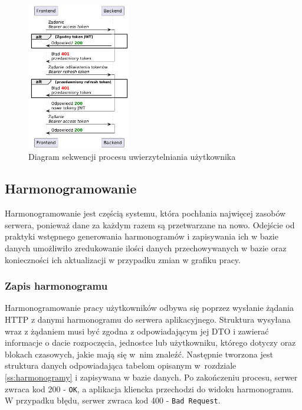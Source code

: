 \begin{figure} [H]
    \centering
    \includegraphics[width=0.4\textwidth]{graf/jwtSeq.png}
    \caption{Diagram sekwencji procesu uwierzytelniania użytkownika}
    \label{fig:authSequence}
\end{figure}

\subsection{Harmonogramowanie}

Harmonogramowanie jest częścią systemu, która pochłania najwięcej zasobów serwera, ponieważ dane za każdym razem są przetwarzane na nowo. Odejście od praktyki wstępnego generowania harmonogramów i zapisywania ich w bazie danych umożliwiło zredukowanie ilości danych przechowywanych w bazie oraz konieczności ich aktualizacji w przypadku zmian w grafiku pracy.

\subsubsection{Zapis harmonogramu}

Harmonogramowanie pracy użytkowników odbywa się poprzez wysłanie żądania HTTP z danymi harmonogramu do serwera aplikacyjnego. Struktura wysyłana wraz z żądaniem musi być zgodna z odpowiadającym jej DTO i zawierać informacje o dacie rozpoczęcia, jednostce lub użytkowniku, którego dotyczy oraz blokach czasowych, jakie mają się w~nim znaleźć. Następnie tworzona jest struktura danych odpowiadająca tabelom opisanym w~rozdziale \ref{ss:harmonogramy} i zapisywana w bazie danych. Po zakończeniu procesu, serwer zwraca kod 200 - \texttt{OK}, a aplikacja kliencka przechodzi do widoku harmonogramu. W przypadku błędu, serwer zwraca kod 400 - \texttt{Bad Request}.

